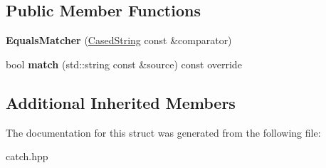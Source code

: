 \subsection*{Public Member Functions}
\begin{DoxyCompactItemize}
\item 
{\bfseries Equals\+Matcher} (\hyperlink{structCatch_1_1Matchers_1_1StdString_1_1CasedString}{Cased\+String} const \&comparator)\hypertarget{structCatch_1_1Matchers_1_1StdString_1_1EqualsMatcher_ab740f1fb2310e9fe3fed5134d4c7e4c8}{}\label{structCatch_1_1Matchers_1_1StdString_1_1EqualsMatcher_ab740f1fb2310e9fe3fed5134d4c7e4c8}

\item 
bool {\bfseries match} (std\+::string const \&source) const override\hypertarget{structCatch_1_1Matchers_1_1StdString_1_1EqualsMatcher_a0bb9d64693f7bb1ef7441062d219f21a}{}\label{structCatch_1_1Matchers_1_1StdString_1_1EqualsMatcher_a0bb9d64693f7bb1ef7441062d219f21a}

\end{DoxyCompactItemize}
\subsection*{Additional Inherited Members}


The documentation for this struct was generated from the following file\+:\begin{DoxyCompactItemize}
\item 
catch.\+hpp\end{DoxyCompactItemize}

